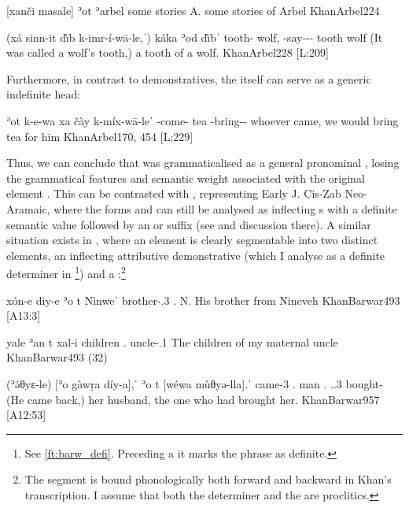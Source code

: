 {[xanči masale] ʾot\cb{} ʾarbel}
{some stories \lnk\cb{} A.}
{some stories of Arbel}
{KhanArbel}{224}

{(xá\cb{} sinn-it dī̀b k-imr-í-wā-le,ˈ) káka ʾod\cb{} dī̀bˈ}
{\indef\cb{} tooth-\cst{} wolf, \ind-say-\pl-\pst-\masc{} tooth \lnk\cb{} wolf}
{(It was called a wolf's tooth,) a tooth of a wolf.}
{KhanArbel}{228 {[L:209]}}

Furthermore, in contrast to demonstratives, the \lnk* itself can serve as a generic indefinite head:

{ʾot\cb{} k-e-wa xa\cb{} čày k-míx-wā-leˈ}
{\lnk\cb{} \ind-come-\pst{} \indef\cb{} tea \ind-bring-\pst-\masc}
{whoever came, we would bring tea for him}
{KhanArbel}{170, 454 {[L:229]}}

Thus, we can conclude that  was grammaticalised as a general pronominal \lnk*, losing the grammatical features and semantic weight associated with the original \dem* element .
This can be contrasted with \Nrt, representing Early J. Cis-Zab Neo-Aramaic, where the forms  and  can still be analysed as inflecting \dem*s with a definite semantic value followed by an   \lnk* or \cst* suffix (see  and discussion there).  A similar situation exists in \Barw, where an  element is clearly segmentable into two distinct elements, an inflecting attributive demonstrative (which I analyse as a definite determiner in \Barw\footnote{See \vref{ft:barw_defi}. Preceding a \lnk* it marks the \lnk* phrase as definite.}) and a  \lnk*:\footnote{The  segment is bound phonologically both forward and backward in Khan's transcription. I assume that both the determiner  and the \lnk* {} are proclitics.}



{xón-e diy-e ʾo\cb{} t\cb{} Nìnweˈ}
{brother-\poss.3\masc{} \masc{} .\masc\cb{} \lnk\cb{} N.}
{His brother from Nineveh}
{KhanBarwar}{493 {[A13:3]}}

{yale ʾan\cb{} t\cb{} xal-i}
{children .\pl\cb{} \lnk\cb{} uncle-\poss.1\sg}
{The children of my maternal uncle}
{KhanBarwar}{493 {(32)}}

{(ʾə́θyɛ-le) [ʾo\cb{} gàwṛa díy-a],ˈ ʾo\cb{} t\cb{} [wéwa mùθyə-lla].ˈ}
{came-3\masc{} .\masc{} man \fem{} .\masc\cb{} \lnk\cb{} \cop.\pst.3\masc{} bought-\fem}
{(He came back,) her husband, the one who had brought her.}
{KhanBarwar}{957 {[A12:53]}}

